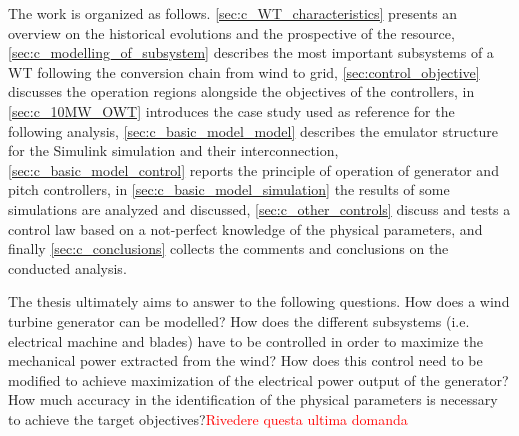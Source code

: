 The work is organized as follows. \autoref{sec:c_WT_characteristics} presents an overview on the historical evolutions and the prospective of the resource, \autoref{sec:c_modelling_of_subsystem} describes the most important subsystems of a WT following the conversion chain from wind to grid, \autoref{sec:control_objective} discusses the operation regions alongside the objectives of the controllers, in \autoref{sec:c_10MW_OWT} introduces the case study used as reference for the following analysis, \autoref{sec:c_basic_model_model} describes the emulator structure for the Simulink simulation and their interconnection, \autoref{sec:c_basic_model_control} reports the principle of operation of generator and pitch controllers, in \autoref{sec:c_basic_model_simulation} the results of some simulations are analyzed and discussed, \autoref{sec:c_other_controls} discuss and tests a control law based on a not-perfect knowledge of the physical parameters, and finally \autoref{sec:c_conclusions} collects the comments and conclusions on the conducted analysis.

The thesis ultimately aims to answer to the following questions. How does a wind turbine generator can be modelled? How does the different subsystems (i.e. electrical machine and blades) have to be controlled in order to maximize the mechanical power extracted from the wind? How does this control need to be modified to achieve maximization of the electrical power output of the generator?
How much accuracy in the identification of the physical parameters is necessary to achieve the target objectives?\textcolor{red}{Rivedere questa ultima domanda}

